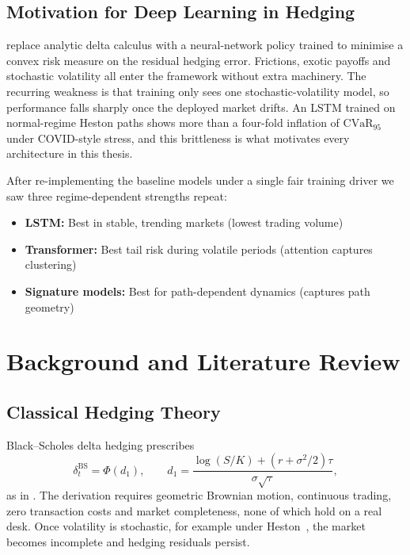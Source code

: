 \documentclass[11pt,oneside]{report}
\begin{document}
\section{Motivation for Deep Learning in Hedging}

\citet{buehler2019deep} replace analytic delta calculus with a neural-network policy trained to minimise a convex risk measure on the residual hedging error. Frictions, exotic payoffs and stochastic volatility all enter the framework without extra machinery. The recurring weakness is that training only sees one stochastic-volatility model, so performance falls sharply once the deployed market drifts. An LSTM trained on normal-regime Heston paths shows more than a four-fold inflation of $\mathrm{CVaR}_{95}$ under COVID-style stress, and this brittleness is what motivates every architecture in this thesis.

After re-implementing the baseline models under a single fair training driver we saw three regime-dependent strengths repeat:
\begin{itemize}[noitemsep]
    \item \textbf{LSTM:} Best in stable, trending markets (lowest trading volume)
    \item \textbf{Transformer:} Best tail risk during volatile periods (attention captures clustering)
    \item \textbf{Signature models:} Best for path-dependent dynamics (captures path geometry)
\end{itemize}

\chapter{Background and Literature Review}
\label{sec:background}

\section{Classical Hedging Theory}

Black--Scholes delta hedging prescribes
\begin{equation}
    \delta_t^{\mathrm{BS}} = \Phi(d_1), \qquad
    d_1 = \frac{\log(S/K) + (r + \sigma^2/2)\tau}{\sigma \sqrt{\tau}},
\end{equation}
as in \citet{black1973pricing}. The derivation requires geometric Brownian motion, continuous trading, zero transaction costs and market completeness, none of which hold on a real desk. Once volatility is stochastic, for example under Heston~\citep{heston1993closed}, the market becomes incomplete and hedging residuals persist.
\end{document}
